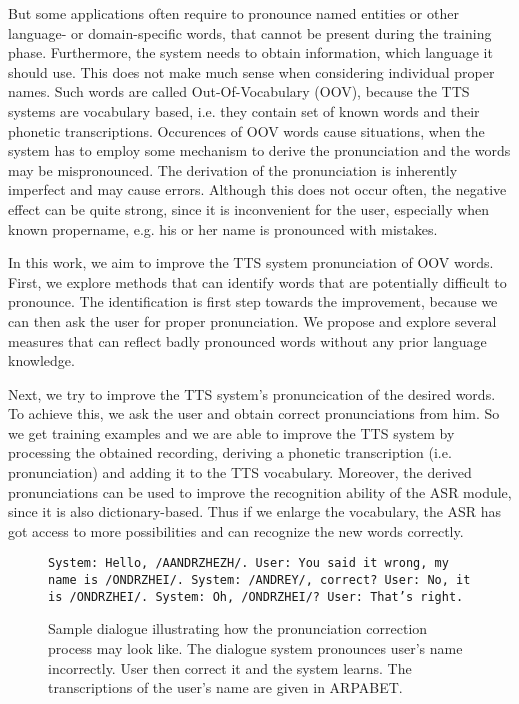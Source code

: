 But some applications often require to pronounce named entities or other language- or domain-specific words, that cannot be present during the training phase.
Furthermore, the system needs to obtain information, which language it should use.
This does not make much sense when considering individual proper names.
Such words are called Out-Of-Vocabulary (OOV), because the TTS systems are vocabulary based, i.e. they contain set of known words and their phonetic transcriptions.
Occurences of OOV words cause situations, when the system has to employ some mechanism to derive the pronunciation and the words may be mispronounced.
The derivation of the pronunciation is inherently imperfect and may cause errors.
Although this does not occur often, the negative effect can be quite strong, since it is inconvenient for the user, especially when known propername, e.g. his or her name is pronounced with mistakes.
\par
In this work, we aim to improve the TTS system pronunciation of OOV words.
First, we explore methods that can identify words that are potentially difficult to pronounce.
The identification is first step towards the improvement, because we can then ask the user for proper pronunciation.
We propose and explore several measures that can reflect badly pronounced words without any prior language knowledge.
\par
Next, we try to improve the TTS system's pronuncication of the desired words.
To achieve this, we ask the user and obtain correct pronunciations from him.
So we get training examples and we are able to improve the TTS system by processing the obtained recording, deriving a phonetic transcription (i.e. pronunciation) and adding it to the TTS vocabulary.
Moreover, the derived pronunciations can be used to improve the recognition ability of the ASR module, since it is also dictionary-based.
Thus if we enlarge the vocabulary, the ASR has got access to more possibilities and can recognize the new words correctly.
\par
\begin{center}
\begin{figure}[h]
\texttt{System: Hello, /AANDRZHEZH/.\linebreak
User: You said it wrong, my name is /ONDRZHEI/.\linebreak
System: /ANDREY/, correct?\linebreak
User: No, it is /ONDRZHEI/.\linebreak
System: Oh, /ONDRZHEI/?\linebreak
User: That's right.
}
\caption{Sample dialogue illustrating how the pronunciation correction process may look like. The dialogue system pronounces user's name incorrectly. User then correct it and the system learns. The transcriptions of the user's name are given in ARPABET.}
\label{dialogsample}
\end{figure}
\end{center}
